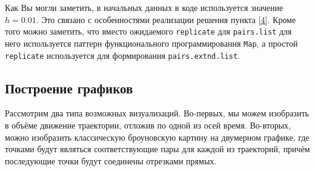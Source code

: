 \documentclass[14pt,a4paper]{scrartcl}
\begin{document}
Как Вы могли заметить, в начальных данных в коде используется значение $h = 0.01$. Это связано с особенностями реализации решения пункта \ref{4}. Кроме того можно заметить, что вместо ожидаемого \texttt{replicate} для \texttt{pairs.list} для него используется паттерн функционального программирования \texttt{Map}, а простой \texttt{replicate} используется для формирования \texttt{pairs.extnd.list}. 

\pagebreak


\subsection{Построение графиков}
Рассмотрим два типа возможных визуализаций. Во-первых, мы можем изобразить в объёме движение траектории, отложив по одной из осей время. Во-вторых, можно изобразить классическую броуновскую картину на двумерном графике, где точками будут являться соответствующие пары для каждой из траекторий, причём последующие точки будут соединены отрезками прямых.
\end{document}
